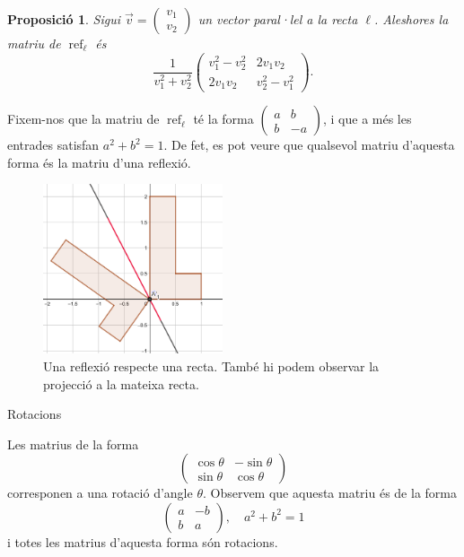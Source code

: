 \documentclass[
  11pt,
]{book}
\makeatletter
\numberwithin{dummy}{section}
\theoremstyle{maincolornumbox}
\theoremstyle{blacknumex}
\theoremstyle{blacknumbox}
\theoremstyle{maincolornum}
\newtheorem{propositionT}{Proposició}[chapter]
\newenvironment{proposition}{\begin{pBox}\begin{propositionT}}{\end{propositionT}\end{pBox}}
\renewcommand{\subsection}{\@startsection {subsection}{2}{\z@}
{-3ex \@plus -0.1ex \@minus -.4ex}
{0.5ex \@plus.2ex }
{\normalfont\sffamily\bfseries}}
\newlength\esp
\makeatother
\begin{document}
\begin{proposition}
\protect\hypertarget{prp:reflexio}{}\label{prp:reflexio}Sigui
\(\vec v = \begin{pmatrix}v_1\\v_2\end{pmatrix}\) un vector paral·lel a la
recta \(\ell\). Aleshores la matriu de \(\operatorname{ref}_\ell\) és
\[\frac{1}{v_1^2 + v_2^2}\begin{pmatrix}v_1^2-v_2^2&2v_1v_2\\2v_1v_2&v_2^2-v_1^2\end{pmatrix}.\]
\end{proposition}

Fixem-nos que la matriu de \(\operatorname{ref}_\ell\) té la forma
\(\begin{pmatrix}a&b\\b&-a\end{pmatrix}\), i que a més les entrades
satisfan \(a^2 + b^2 = 1\). De fet, es pot veure que qualsevol matriu
d'aquesta forma és la matriu d'una reflexió.

\begin{figure}
\hypertarget{fig:reflexio}{%
\centering
\includegraphics[width=\textwidth,height=5cm]{reflexio.png}
\caption{Una reflexió respecte una recta. També hi podem observar la projecció
a la mateixa recta.}\label{fig:reflexio}
}
\end{figure}

\hypertarget{subsubsec:rotacio}{%
\subsection{Rotacions}\label{subsubsec:rotacio}}

Les matrius de la forma
\[\begin{pmatrix}
\cos\theta&-\sin\theta\\
\sin\theta&\cos\theta
\end{pmatrix}\] corresponen a una rotació d'angle \(\theta\). Observem
que aquesta matriu és de la forma \[\begin{pmatrix}
a&-b\\b&a
\end{pmatrix},\quad a^2+b^2=1\] i totes les matrius d'aquesta forma són
rotacions.
\end{document}
